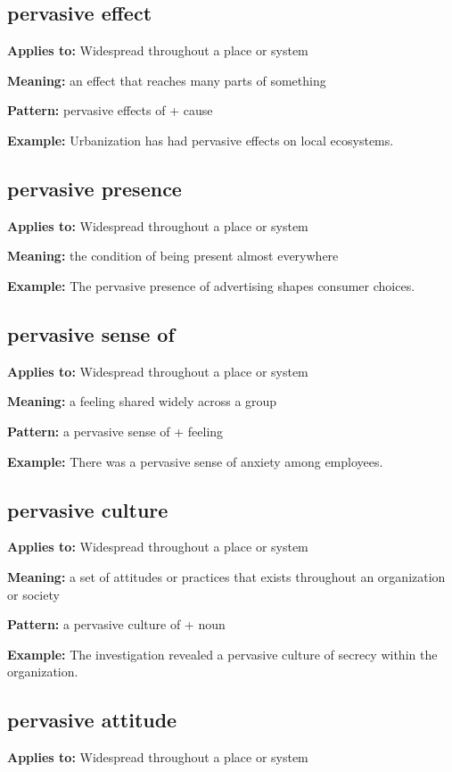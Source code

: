 \documentclass[11pt]{article}
\begin{document}
\subsection{pervasive effect}
\textbf{Applies to:} Widespread throughout a place or system

\textbf{Meaning:} an effect that reaches many parts of something

\textbf{Pattern:} pervasive effects of + cause

\textbf{Example:} Urbanization has had pervasive effects on local ecosystems.

\subsection{pervasive presence}
\textbf{Applies to:} Widespread throughout a place or system

\textbf{Meaning:} the condition of being present almost everywhere

\textbf{Example:} The pervasive presence of advertising shapes consumer choices.

\subsection{pervasive sense of}
\textbf{Applies to:} Widespread throughout a place or system

\textbf{Meaning:} a feeling shared widely across a group

\textbf{Pattern:} a pervasive sense of + feeling

\textbf{Example:} There was a pervasive sense of anxiety among employees.

\subsection{pervasive culture}
\textbf{Applies to:} Widespread throughout a place or system

\textbf{Meaning:} a set of attitudes or practices that exists throughout an organization or society

\textbf{Pattern:} a pervasive culture of + noun

\textbf{Example:} The investigation revealed a pervasive culture of secrecy within the organization.

\subsection{pervasive attitude}
\textbf{Applies to:} Widespread throughout a place or system
\end{document}
